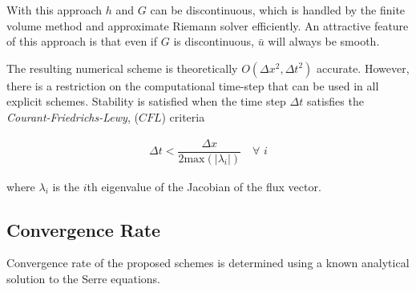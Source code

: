 \documentclass[SingleSpace,12pt]{Serre_ASCE}
\begin{document}
With this approach $h$ and $G$ can be discontinuous, which is handled by the finite volume method and approximate Riemann solver efficiently. An attractive feature of this approach is that even if $G$ is discontinuous, $\bar{u}$ will always be smooth.

The resulting numerical scheme is theoretically $O(\Delta x^2, \Delta t^2)$ accurate. However, there is a restriction on the computational time-step that can be used in all explicit schemes. Stability is satisfied when the time step $\Delta t$ satisfies the \emph{Courant-Friedrichs-Lewy}, ($CFL$) criteria \cite{Harten-etal-1983-357}
\begin{linenomath*}
\begin{gather*} %
\Delta t < \dfrac{\Delta x}{2 \text{max}(|\lambda_i|)}  \quad \forall
\,\, i
\end{gather*}
\end{linenomath*}
where $\lambda_i$ is the $i$th eigenvalue of the Jacobian of the flux vector.

\subsection{Convergence Rate}
\label{section:Convergence Rate}

Convergence rate of the proposed schemes is determined using a known analytical solution to the Serre equations.
\end{document}
